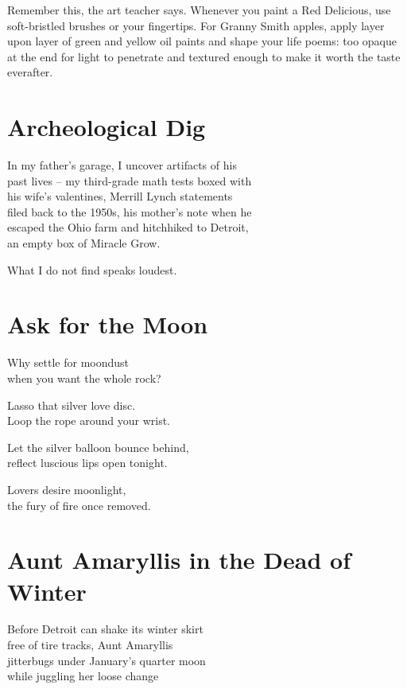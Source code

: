 \documentclass[twoside,10pt]{book}
\begin{document}
Remember this, the art teacher says. Whenever you paint a Red Delicious,
use soft-bristled brushes or your fingertips. For Granny Smith apples,
apply layer upon layer of green and yellow oil paints and shape your
life poems: too opaque at the end for light to penetrate and textured
enough to make it worth the taste everafter.

\clearpage
\section{Archeological Dig}

In my father's garage, I uncover artifacts of his\\
past lives -- my third-grade math tests boxed with\\
his wife's valentines, Merrill Lynch statements\\
filed back to the 1950s, his mother's note when he\\
escaped the Ohio farm and hitchhiked to Detroit,\\
an empty box of Miracle Grow.

What I do not find speaks loudest.

\clearpage
\section{Ask for the Moon}

Why settle for moondust\\
when you want the whole rock?

Lasso that silver love disc.\\
Loop the rope around your wrist.

Let the silver balloon bounce behind,\\
reflect luscious lips open tonight.

Lovers desire moonlight,\\
the fury of fire once removed.

\clearpage
\section{Aunt Amaryllis in the Dead of Winter}

Before Detroit can shake its winter skirt\\
free of tire tracks, Aunt Amaryllis\\
jitterbugs under January's quarter moon\\
while juggling her loose change
\end{document}
